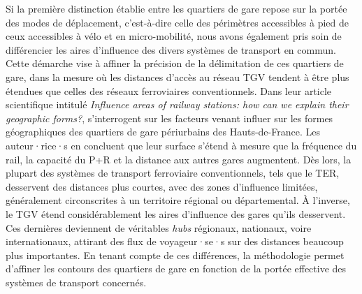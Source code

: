 \begin{refsegment}
Si la première distinction établie entre les quartiers de gare repose sur la portée des modes de déplacement, c’est-à-dire celle des périmètres accessibles à pied de ceux accessibles à vélo et en \gls{micro-mobilité}, nous avons également pris soin de différencier les aires d’influence des divers systèmes de transport en commun. Cette démarche vise à affiner la précision de la délimitation de ces quartiers de gare, dans la mesure où les distances d’accès au réseau \acrshort{TGV} tendent à être plus étendues que celles des réseaux ferroviaires conventionnels. Dans leur article scientifique intitulé \foreignlanguage{english}{\textsl{Influence areas of railway stations: how can we explain their geographic forms?}}, \textcolor{blue}{\textcite[5-6]{hasiak_influence_2016}} s'interrogent sur les facteurs venant influer sur les formes géographiques des quartiers de gare périurbains des Hauts-de-France. Les auteur·rice·s en concluent que leur surface s'étend à mesure que la fréquence du rail, la capacité du \acrshort{P+R} et la distance aux autres gares augmentent. Dès lors, la plupart des systèmes de transport ferroviaire conventionnels, tels que le \acrshort{TER}, desservent des distances plus courtes, avec des zones d’influence limitées, généralement circonscrites à un territoire régional ou départemental. À l’inverse, le \acrshort{TGV} étend considérablement les aires d’influence des gares qu’ils desservent. Ces dernières deviennent de véritables \textsl{hubs} régionaux, nationaux, voire internationaux, attirant des flux de voyageur·se·s sur des distances beaucoup plus importantes. En tenant compte de ces différences, la méthodologie permet d’affiner les contours des quartiers de gare en fonction de la portée effective des systèmes de transport concernés.%


\end{refsegment}
